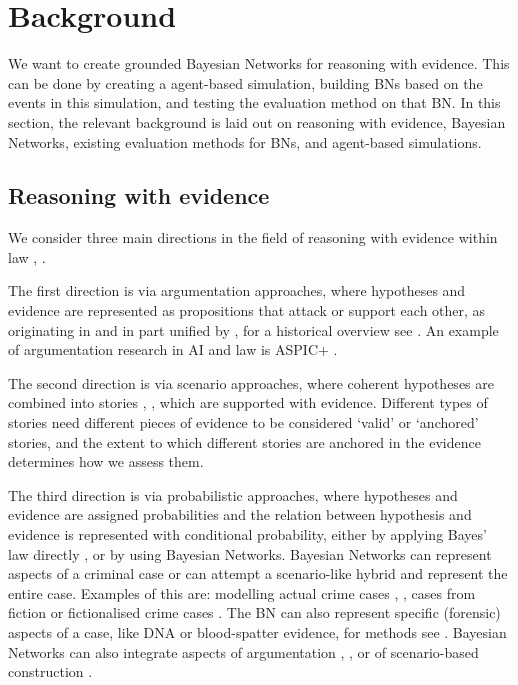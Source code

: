 \documentclass[12pt]{article}
\begin{document}
 

\newpage

\section{Background}

We want to create grounded Bayesian Networks for reasoning with evidence. This can be done by creating a agent-based simulation, building BNs based on the events in this simulation, and testing the evaluation method on that BN. In this section, the relevant background is laid out on reasoning with evidence, Bayesian Networks, existing evaluation methods for BNs, and agent-based simulations.


\subsection{Reasoning with evidence}
We consider three main directions in the field of reasoning with evidence within law \citep{Verheij2015}, \citep{diBelloVerheij2018}. 

The first direction is via argumentation approaches, where hypotheses and evidence are represented as propositions that attack or support each other, as originating in \citep{wigmore1931} and in part unified by \citet{dung1995}, for a historical overview see \citep{benchcapon2019}. An example of argumentation research in AI and law is ASPIC+ \citep{prakkenEtal2013}. 

The second direction is via scenario approaches, where coherent hypotheses are combined into stories \citep{penningtonHastie1993}, \citep{wagenaarEtal1993}, which are supported with evidence. Different types of stories need different pieces of evidence to be considered `valid' or `anchored' stories, and the extent to which different stories are anchored in the evidence determines how we assess them. 

The third direction is via probabilistic approaches, where hypotheses and evidence are assigned probabilities and the relation between hypothesis and evidence is represented with conditional probability, either by applying Bayes' law directly \citep{dahlman2020}, or by using Bayesian Networks. Bayesian Networks can represent aspects of a criminal case or can attempt a scenario-like hybrid and represent the entire case. Examples of this are: modelling actual crime cases \citep{kadaneSchum1996}, \citep{Fenton2019},  cases from fiction \citep{Fenton2012} or fictionalised crime cases \citep{vanLeeuwen2019}. The BN can also represent specific (forensic) aspects of a case, like DNA or blood-spatter evidence, for methods see \citep{Meester2021}. Bayesian Networks can also integrate aspects of argumentation \citep{wieten2019}, \citep{timmer2017}, or of scenario-based construction \citep{vlek2016}.
\end{document}
